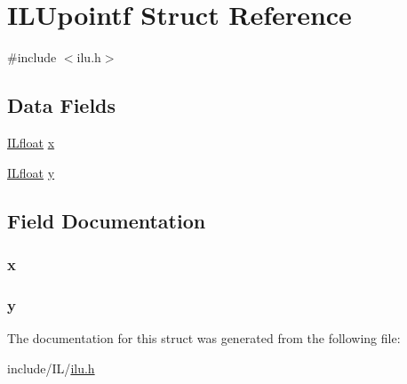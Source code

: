 \hypertarget{struct_i_l_upointf}{\section{I\-L\-Upointf Struct Reference}
\label{struct_i_l_upointf}
}


{\ttfamily \#include $<$ilu.\-h$>$}

\subsection*{Data Fields}
\begin{DoxyCompactItemize}
\item 
\hyperlink{il_8h_a0576415379485bafa4b5f61989797b5e}{I\-Lfloat} \hyperlink{struct_i_l_upointf_a6fe338394a16135b8e04a1dfbebe91c5}{x}
\item 
\hyperlink{il_8h_a0576415379485bafa4b5f61989797b5e}{I\-Lfloat} \hyperlink{struct_i_l_upointf_a015230e41bc2c902e8bba94b4501c689}{y}
\end{DoxyCompactItemize}


\subsection{Field Documentation}
\hypertarget{struct_i_l_upointf_a6fe338394a16135b8e04a1dfbebe91c5}{
\subsubsection[{x}]{ x}}\label{struct_i_l_upointf_a6fe338394a16135b8e04a1dfbebe91c5}
\hypertarget{struct_i_l_upointf_a015230e41bc2c902e8bba94b4501c689}{
\subsubsection[{y}]{ y}}\label{struct_i_l_upointf_a015230e41bc2c902e8bba94b4501c689}


The documentation for this struct was generated from the following file\-:\begin{DoxyCompactItemize}
\item 
include/\-I\-L/\hyperlink{ilu_8h}{ilu.\-h}\end{DoxyCompactItemize}
